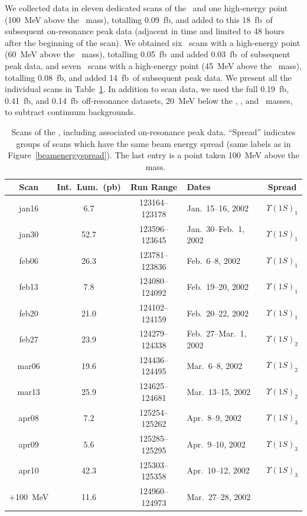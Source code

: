 \documentclass{cornell}
\begin{document}
We collected data in eleven dedicated scans of the \us\ and one
high-energy point (100~MeV above the \us\ mass), totalling
0.09~fb\inv, and added to this 18~fb\inv\ of subsequent on-resonance
peak data (adjacent in time and limited to 48 hours after the
beginning of the scan).  We obtained six \uss\ scans with a
high-energy point (60~MeV above the \uss\ mass), totalling
0.05~fb\inv\, and added 0.03~fb\inv\ of subsequent peak data, and
seven \usss\ scans with a high-energy point (45~MeV above the \usss\
mass), totalling 0.08~fb\inv, and added 14~fb\inv\ of subsequent peak
data.  We present all the individual scans in Table~\ref{tab:scansa}.
In addition to scan data, we used the full 0.19~fb\inv, 0.41~fb\inv,
and 0.14~fb\inv\ off-resonance datasets, 20~MeV below the \us, \uss,
and \usss\ masses, to subtract continuum backgrounds.

\begin{table}
  \caption[Dates and integrated luminosity of \us\ scans]{\label{tab:scansa} Scans of the \us, including associated
  on-resonance peak data.  ``Spread'' indicates groups of scans which have
  the same beam energy spread (same labels as in
  Figure~\ref{beamenergyspread}).  The last entry is a point taken
  100~MeV above the \us\ mass.}
  \begin{center}
    \begin{tabular}{c c c l c}
    \hline\hline Scan & Int.\ Lum.\ (pb\inv) & Run Range & \hspace{1 cm} Dates \hfill & Spread \\\hline
      jan16 & 6.7  & 123164--123178 & Jan.\ 15--16, \hfill 2002 & $\Upsilon(1S)_1$ \\
      jan30 & 52.7 & 123596--123645 & Jan.\ 30--Feb.\  1, \hfill 2002 & $\Upsilon(1S)_1$ \\
      feb06 & 26.3 & 123781--123836 & Feb.\  6--8, \hfill 2002 & $\Upsilon(1S)_1$ \\
      feb13 & 7.8  & 124080--124092 & Feb.\ 19--20, \hfill 2002 & $\Upsilon(1S)_1$ \\
      feb20 & 21.0 & 124102--124159 & Feb.\ 20--22, \hfill 2002 & $\Upsilon(1S)_1$ \\
      feb27 & 23.9 & 124279--124338 & Feb.\ 27--Mar.\  1, \hfill 2002 & $\Upsilon(1S)_2$ \\
      mar06 & 19.6 & 124436--124495 & Mar.\  6--8, \hfill 2002 & $\Upsilon(1S)_2$ \\
      mar13 & 25.9 & 124625--124681 & Mar.\ 13--15, \hfill 2002 & $\Upsilon(1S)_2$ \\
      apr08 & 7.2  & 125254--125262 & Apr.\  8--9, \hfill 2002 & $\Upsilon(1S)_3$ \\
      apr09 & 5.6  & 125285--125295 & Apr.\  9--10, \hfill 2002 & $\Upsilon(1S)_3$ \\
      apr10 & 42.3 & 125303--125358 & Apr.\ 10--12, \hfill 2002 & $\Upsilon(1S)_3$ \\
   +100~MeV & 11.6 & 124960--124973 & Mar.\ 27--28, \hfill 2002 &  \\\hline\hline
    \end{tabular}
  \end{center}
\end{table}
\end{document}
